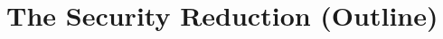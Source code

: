 \documentclass[10pt, aspectratio=169]{beamer}
\begin{document}

    

\section{The Security Reduction (Outline)}
\end{document}
